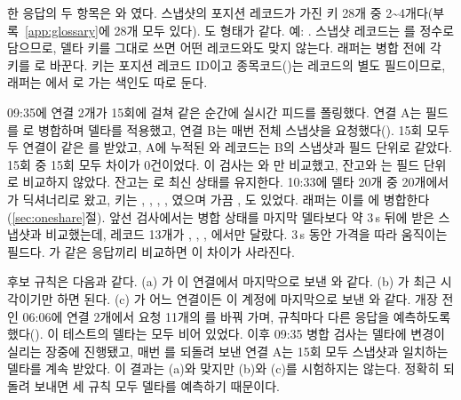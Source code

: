{\RaggedRight {} 한 응답의 두 항목은 와 였다. 스냅샷의 포지션 레코드가 가진 키 28개 중 2\textasciitilde 4개다(부록~\ref{app:glossary}에 28개 모두 있다). 도 형태가 같다. 예: . 스냅샷 레코드는 를 정수로 담으므로, 델타 키를 그대로 쓰면 어떤 레코드와도 맞지 않는다. 래퍼는 병합 전에 각 키를 로 바꾼다. 키는 포지션 레코드 ID이고 종목코드()는 레코드의 별도 필드이므로, 래퍼는 에서 로 가는 색인도 따로 둔다.\par}

 09:35에 연결 2개가 15회에 걸쳐 같은 순간에 실시간 피드를 폴링했다. 연결 A는  필드를 로 병합하며 델타를 적용했고, 연결 B는 매번 전체 스냅샷을 요청했다(). 15회 모두 두 연결이 같은 를 받았고, A에 누적된 와  레코드는 B의 스냅샷과 필드 단위로 같았다. 15회 중 15회 모두 차이가 0건이었다. 이 검사는 와 만 비교했고, 잔고와 는 필드 단위로 비교하지 않았다. 잔고는 로 최신 상태를 유지한다. 10:33에 델타 20개 중 20개에서 가 딕셔너리로 왔고, 키는 , , , , 였으며 가끔 , 도 있었다. 래퍼는 이를 에 병합한다(\ref{sec:oneshare}절). 앞선 검사에서는 병합 상태를 마지막 델타보다 약 3\,s 뒤에 받은 스냅샷과 비교했는데, 레코드 13개가 , , , 에서만 달랐다. 3\,s 동안 가격을 따라 움직이는 필드다. 가 같은 응답끼리 비교하면 이 차이가 사라진다.

 후보 규칙은 다음과 같다. (a) 가 이 연결에서 마지막으로 보낸 와 같다. (b) 가 최근 시각이기만 하면 된다. (c) 가 어느 연결이든 이 계정에 마지막으로 보낸 와 같다. 개장 전인 06:06에 연결 2개에서 요청 11개의 를 바꿔 가며, 규칙마다 다른 응답을 예측하도록 했다(). 이 테스트의 델타는 모두 비어 있었다. 이후 09:35 병합 검사는 델타에 변경이 실리는 장중에 진행됐고, 매번 를 되돌려 보낸 연결 A는 15회 모두 스냅샷과 일치하는 델타를 계속 받았다. 이 결과는 (a)와 맞지만 (b)와 (c)를 시험하지는 않는다. 정확히 되돌려 보내면 세 규칙 모두 델타를 예측하기 때문이다.

